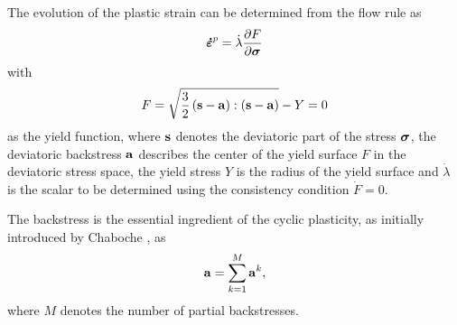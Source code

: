 \documentclass[preprint,5p,twocolumn,11pt,sort&compress]{elsarticle}
\newcommand{\bfsigma}{{\mbox{\boldmath{$\sigma$}}}}
\newcommand{\dotbfepsilon}{{\mbox{\boldmath{$\dot\varepsilon$}}}}
\newcommand{\bfa}{{\bf a}}
\newcommand{\bfs}{{\bf s}}
\begin{document}
The evolution of the plastic strain can be determined from the flow rule as
\begin{equation}
{\dotbfepsilon}^p = \dot \lambda \frac{{\partial F}}{{\partial {\bfsigma}}}
\end{equation}
with
\begin{equation}
F = \sqrt {\frac{3}{2}\left( {\bfs - \bfa} \right):\left( {\bfs - \bfa} \right)}  - Y=0
\end{equation}
as the yield function, where $\bfs$ denotes the deviatoric part of the stress ${\bfsigma}$, the deviatoric backstress $\bfa$ describes the center of the yield surface $F$ in the deviatoric stress space, the yield stress $Y$ is the radius of the yield surface and $\dot \lambda$ is the scalar to be determined using the consistency condition $\dot F = 0$.

The backstress is the essential ingredient of the cyclic plasticity, as initially introduced by Chaboche \cite{Chaboche1986149}, as
\begin{equation}
\bfa = \sum\limits_{k = 1}^M {{\bfa^k}},
\end{equation}
where $M$ denotes the number of partial backstresses.
\end{document}
